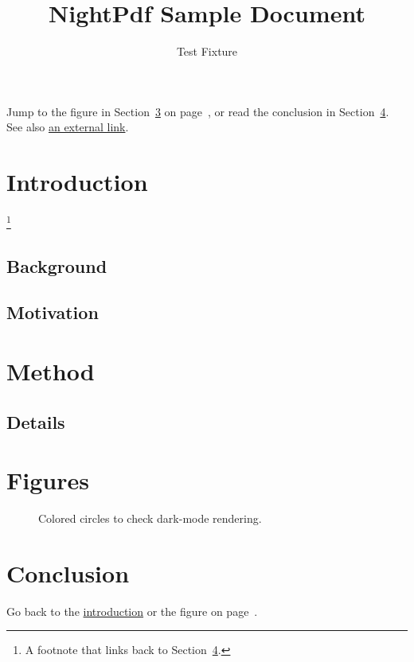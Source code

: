 \documentclass[11pt]{article}
\title{NightPdf Sample Document}
\author{Test Fixture}
\begin{document}
\maketitle
\tableofcontents
\noindent Jump to the figure in Section~\ref{sec:fig} on page~\pageref{fig:circles}, or read the conclusion in Section~\ref{sec:end}.
See also \href{https://www.apple.com}{an external link}.
\newpage
\section{Introduction}\label{sec:intro}
\lipsum[1-4]\footnote{A footnote that links back to Section~\ref{sec:end}.}
\subsection{Background}
\lipsum[5-9]
\subsection{Motivation}
\lipsum[10-14]
\section{Method}
\lipsum[15-20]
\subsection{Details}
\lipsum[21-26]
\section{Figures}\label{sec:fig}
\begin{figure}[h]\centering
{}
\caption{Colored circles to check dark-mode rendering.}\label{fig:circles}
\end{figure}
\lipsum[27-34]
\section{Conclusion}\label{sec:end}
Go back to the \hyperref[sec:intro]{introduction} or the figure on page~\pageref{fig:circles}.
\lipsum[35-45]
\end{document}
